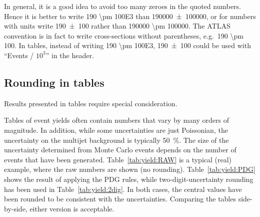 \documentclass[UKenglish]{style/atlasdoc}
\begin{document}
In general, it is a good idea
to avoid too many zeroes in the quoted numbers. Hence it is better
to write \num{190 \pm 100E3} than \num{190000 \pm 100000}, or for
numbers with units write \SI{190 \pm 100}{\nb} rather than \SI{190000
  \pm 100000}{\pb}. The ATLAS convention is in fact to write cross-sections
without parentheses, e.g.\ \SI[multi-part-units=single]{190 \pm
  100}{\nb}. In tables, instead of writing \num{190 \pm 100E3},
\num{190 \pm 100} could be used with \enquote{Events / $10^3$} in
the header.

\subsection{Rounding in tables}
\label{sec:recc:table}

Results presented in tables require special consideration.

Tables of event yields often contain numbers that vary by many orders
of magnitude. In addition, while some uncertainties are just Poissonian, the
uncertainty on the multijet background is typically
\SI{50}{\percent}. The size of the uncertainty determined from Monte Carlo
events depends on the number of events that have been
generated. Table~\ref{tab:yield:RAW} is a typical (real) example, where the
raw numbers are shown (no rounding).  Table~\ref{tab:yield:PDG} shows the
result of applying the PDG rules, while two-digit-uncertainty rounding has
been used in Table~\ref{tab:yield:2dig}.  In both cases, the central values
have been rounded to be consistent with the uncertainties. Comparing the
tables side-by-side, either version is acceptable.  
\end{document}
